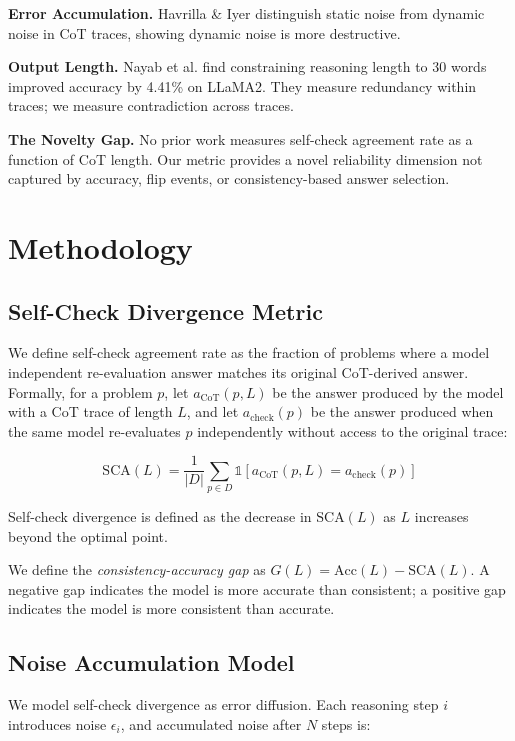 \documentclass[11pt,letterpaper]{article}
\begin{document}
\textbf{Error Accumulation.} Havrilla \& Iyer \citep{Havrilla2024} distinguish static noise from dynamic noise in CoT traces, showing dynamic noise is more destructive.

\textbf{Output Length.} Nayab et al. \citep{Nayab2024} find constraining reasoning length to 30 words improved accuracy by 4.41\% on LLaMA2. They measure redundancy within traces; we measure contradiction across traces.

\textbf{The Novelty Gap.} No prior work measures self-check agreement rate as a function of CoT length. Our metric provides a novel reliability dimension not captured by accuracy, flip events, or consistency-based answer selection.

\section{Methodology}

\subsection{Self-Check Divergence Metric}

We define self-check agreement rate as the fraction of problems where a model independent re-evaluation answer matches its original CoT-derived answer. Formally, for a problem $p$, let $a_{\text{CoT}}(p, L)$ be the answer produced by the model with a CoT trace of length $L$, and let $a_{\text{check}}(p)$ be the answer produced when the same model re-evaluates $p$ independently without access to the original trace:

\[
\text{SCA}(L) = \frac{1}{|D|} \sum_{p \in D} \mathbb{1}[a_{\text{CoT}}(p, L) = a_{\text{check}}(p)]
\]

Self-check divergence is defined as the decrease in $\text{SCA}(L)$ as $L$ increases beyond the optimal point.

We define the \textit{consistency-accuracy gap} as $G(L) = \text{Acc}(L) - \text{SCA}(L)$. A negative gap indicates the model is more accurate than consistent; a positive gap indicates the model is more consistent than accurate.

\subsection{Noise Accumulation Model}

We model self-check divergence as error diffusion. Each reasoning step $i$ introduces noise $\epsilon_i$, and accumulated noise after $N$ steps is:
\end{document}
